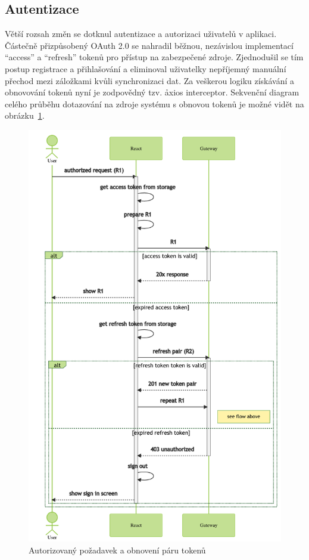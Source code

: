 \subsection{Autentizace}\label{subsec:client-auth}

Větší rozsah změn se dotknul autentizace a autorizaci uživatelů v aplikaci.
Částečně přizpůsobený OAuth 2.0 se nahradil běžnou, nezávislou implementací \enquote{access} a \enquote{refresh} tokenů pro přístup na zabezpečené zdroje.
Zjednodušil se tím postup registrace a přihlašování a eliminoval uživatelky nepříjemný manuální přechod mezi záložkami kvůli synchronizaci dat.
Za veškerou logiku získávání a obnovování tokenů nyní je zodpovědný tzv. \h{axios interceptor}.
Sekvenční diagram celého průběhu dotazování na zdroje systému s obnovou tokenů je možné vidět na obrázku~\ref{fig:cli-tokens}.


\begin{figure}[htbp]
   \centering
   \includegraphics[max width=\textwidth]{assets/dia-seq-tokens}
   \caption{Autorizovaný požadavek a obnovení páru tokenů}\label{fig:cli-tokens}
\end{figure}



